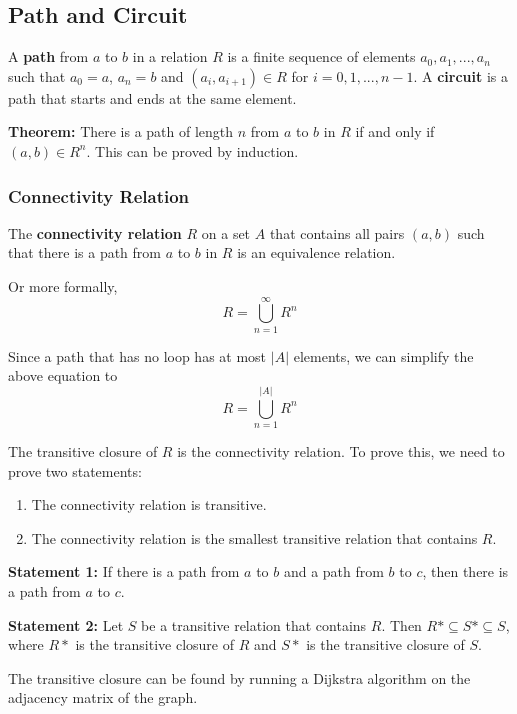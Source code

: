 \documentclass[a4paper,12pt]{article}
\begin{document}
\subsection{Path and Circuit}

A \textbf{path} from $a$ to $b$ in a relation $R$ is a finite sequence of elements $a_0, a_1, ..., a_n$ such that $a_0 = a$, $a_n = b$ and $(a_i, a_{i+1}) \in R$ for $i = 0, 1, ..., n-1$.
A \textbf{circuit} is a path that starts and ends at the same element.

\textbf{Theorem:}
There is a path of length $n$ from $a$ to $b$ in $R$ if and only if $(a,b) \in R^n$.
This can be proved by induction.

\subsubsection{Connectivity Relation}

The \textbf{connectivity relation} $R$ on a set $A$ that contains all pairs $(a,b)$ such that there is a path from $a$ to $b$ in $R$ is an equivalence relation.

Or more formally,
\begin{equation*}
	R = \bigcup_{n=1}^{\infty} R^n
\end{equation*}

Since a path that has no loop has at most $|A|$ elements, we can simplify the above equation to
\begin{equation*}
	R = \bigcup_{n=1}^{|A|} R^n
\end{equation*}

The transitive closure of $R$ is the connectivity relation.
To prove this, we need to prove two statements:
\begin{enumerate}
	\item The connectivity relation is transitive.
	\item The connectivity relation is the smallest transitive relation that contains $R$.
\end{enumerate}

\textbf{Statement 1:}
If there is a path from $a$ to $b$ and a path from $b$ to $c$, then there is a path from $a$ to $c$.

\textbf{Statement 2:}
Let $S$ be a transitive relation that contains $R$.
Then $R* \subseteq S* \subseteq S$, where $R*$ is the transitive closure of $R$ and $S*$ is the transitive closure of $S$.

The transitive closure can be found by running a Dijkstra algorithm on the adjacency matrix of the graph.
\end{document}
